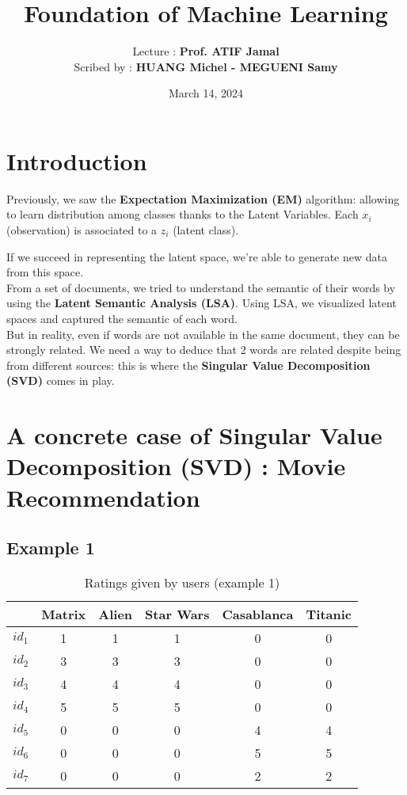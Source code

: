 \documentclass{article}
\title{\textbf{Foundation of Machine Learning}}
\author{Lecture : \textbf{Prof. ATIF Jamal} \\ Scribed by : \textbf{HUANG Michel - MEGUENI Samy}}
\date{March 14, 2024}
\begin{document}
\maketitle
\tableofcontents
\vspace{5mm}

\section{Introduction}

\par Previously, we saw the \textbf{Expectation Maximization (EM)} algorithm: allowing to learn distribution among classes thanks to the Latent Variables. Each $x_i$ (observation) is associated to a $z_i$ (latent class).
 
If we succeed in representing the latent space, we're able to generate new data from this space.
\\

From a set of documents, we tried to understand the semantic of their words by using the \textbf{Latent Semantic Analysis (LSA)}. Using LSA, we visualized latent spaces and captured the semantic of each word.
\\

But in reality, even if words are not available in the same document, they can be strongly related.
We need a way to deduce that 2 words are related despite being from different sources: this is where the \textbf{Singular Value Decomposition (SVD)} comes in play.

\section{A concrete case of Singular Value Decomposition (SVD) : Movie Recommendation}
\subsection{Example 1}

\begin{table}[hb]
    \centering
    \begin{tabular}{|c|c|c|c|c|c|}
        \hline
        \textbf{} & \textbf{Matrix} & \textbf{Alien} & \textbf{Star Wars} & \textbf{Casablanca} & \textbf{Titanic} \\
        \hline
        $id_1$ & 1 & 1 & 1 & 0 & 0\\
        $id_2$ & 3 & 3 & 3 & 0 & 0\\
        $id_3$ & 4 & 4 & 4 & 0 & 0\\
        $id_4$ & 5 & 5 & 5 & 0 & 0\\
        $id_5$ & 0 & 0 & 0 & 4 & 4\\
        $id_6$ & 0 & 0 & 0 & 5 & 5\\
        $id_7$ & 0 & 0 & 0 & 2 & 2\\
        \hline
    \end{tabular}
    \caption{Ratings given by users (example 1)}
    \label{tab:ratings_users_1}
\end{table}
\end{document}
